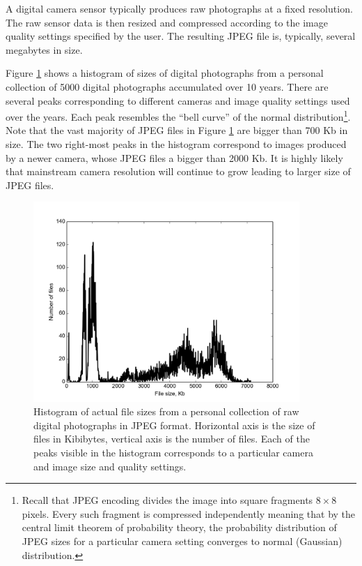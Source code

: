 \documentclass[final,5p,times,twocolumn,authoryear]{elsarticle}
\begin{document}
A digital camera sensor typically produces raw photographs at a fixed resolution. The raw sensor data is then resized and compressed according to the image quality settings specified by the user. The resulting JPEG file is, typically, several megabytes in size. 

Figure \ref{fig:jpeg-dist} shows a histogram of sizes of digital photographs from a personal collection of 5000 digital photographs accumulated over 10 years. There are several peaks corresponding to different cameras and image quality settings used over the years. Each peak resembles the ``bell curve'' of the normal distribution\footnote{Recall that JPEG encoding divides the image into square fragments $8 \times 8$ pixels. Every such fragment is compressed independently meaning that by the central limit theorem of probability theory, the probability distribution of JPEG sizes for a particular camera setting converges to normal (Gaussian) distribution.}. Note that the vast majority of JPEG files in Figure \ref{fig:jpeg-dist} are bigger than 700 Kb in size. The two right-most peaks in the histogram correspond to images produced by a newer camera, whose JPEG files a bigger than 2000 Kb. It is highly likely that mainstream camera resolution will continue to grow leading to larger size of JPEG files. 

\begin{figure}
  \centerline{\includegraphics[width=0.9\textwidth]{jpeg-sizes}}
  \caption{Histogram of actual file sizes from a personal collection of raw digital photographs in JPEG format. Horizontal axis is the size of files in Kibibytes, vertical axis is the number of files. Each of the peaks visible in the histogram corresponds to a particular camera and image size and quality settings.}
  \label{fig:jpeg-dist}
\end{figure}
\end{document}
